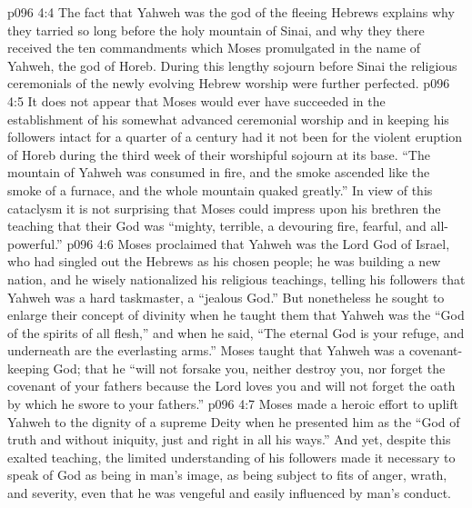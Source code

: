 \vs p096 4:4 \pc The fact that Yahweh was the god of the fleeing Hebrews explains why they tarried so long before the holy mountain of Sinai, and why they there received the ten commandments which Moses promulgated in the name of Yahweh, the god of Horeb. During this lengthy sojourn before Sinai the religious ceremonials of the newly evolving Hebrew worship were further perfected.
\vs p096 4:5 \pc It does not appear that Moses would ever have succeeded in the establishment of his somewhat advanced ceremonial worship and in keeping his followers intact for a quarter of a century had it not been for the violent eruption of Horeb during the third week of their worshipful sojourn at its base. “The mountain of Yahweh was consumed in fire, and the smoke ascended like the smoke of a furnace, and the whole mountain quaked greatly.” In view of this cataclysm it is not surprising that Moses could impress upon his brethren the teaching that their God was “mighty, terrible, a devouring fire, fearful, and all\hyp{}powerful.”
\vs p096 4:6 Moses proclaimed that Yahweh was the Lord God of Israel, who had singled out the Hebrews as his chosen people; he was building a new nation, and he wisely nationalized his religious teachings, telling his followers that Yahweh was a hard taskmaster, a “jealous God.” But nonetheless he sought to enlarge their concept of divinity when he taught them that Yahweh was the “God of the spirits of all flesh,” and when he said, “The eternal God is your refuge, and underneath are the everlasting arms.” Moses taught that Yahweh was a covenant\hyp{}keeping God; that he “will not forsake you, neither destroy you, nor forget the covenant of your fathers because the Lord loves you and will not forget the oath by which he swore to your fathers.”
\vs p096 4:7 Moses made a heroic effort to uplift Yahweh to the dignity of a supreme Deity when he presented him as the “God of truth and without iniquity, just and right in all his ways.” And yet, despite this exalted teaching, the limited understanding of his followers made it necessary to speak of God as being in man’s image, as being subject to fits of anger, wrath, and severity, even that he was vengeful and easily influenced by man’s conduct.
